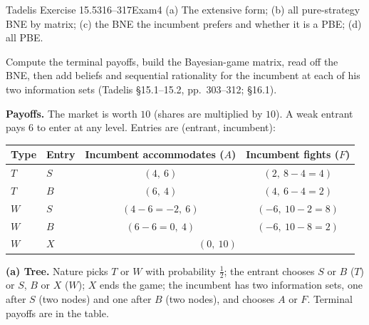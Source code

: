 \begin{exsol}{Tadelis Exercise 15.5}{316--317}{Exam}{4}
\asked (a) The extensive form; (b) all pure-strategy BNE by matrix; (c) the BNE the incumbent
prefers and whether it is a PBE; (d) all PBE.

\method Compute the terminal payoffs, build the Bayesian-game matrix, read off the BNE, then add
beliefs and sequential rationality for the incumbent at each of his two information sets (Tadelis
\S15.1--15.2, pp.~303--312; \S16.1).

\solution \textbf{Payoffs.} The market is worth $10$ (shares are multiplied by $10$). A weak entrant
pays $6$ to enter at any level. Entries are (entrant, incumbent):
\begin{center}
\begin{tabular}{llcc}
\toprule
Type & Entry & Incumbent accommodates ($A$) & Incumbent fights ($F$) \\
\midrule
$T$ & $S$ & $(4,\ 6)$ & $(2,\ 8-4 = 4)$ \\
$T$ & $B$ & $(6,\ 4)$ & $(4,\ 6-4 = 2)$ \\
$W$ & $S$ & $(4-6 = -2,\ 6)$ & $(-6,\ 10-2 = 8)$ \\
$W$ & $B$ & $(6-6 = 0,\ 4)$ & $(-6,\ 10-8 = 2)$ \\
$W$ & $X$ & \multicolumn{2}{c}{$(0,\ 10)$} \\
\bottomrule
\end{tabular}
\end{center}
\textbf{(a) Tree.} Nature picks $T$ or $W$ with probability $\frac12$; the entrant chooses $S$ or $B$
($T$) or $S$, $B$ or $X$ ($W$); $X$ ends the game; the incumbent has two information sets, one after
$S$ (two nodes) and one after $B$ (two nodes), and chooses $A$ or $F$. Terminal payoffs are in the table.


\end{exsol}
